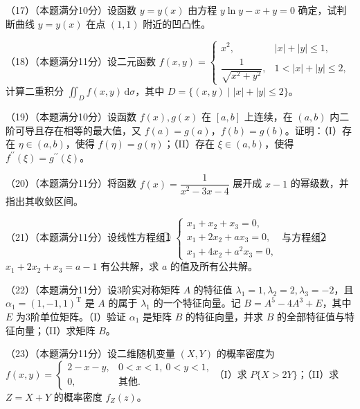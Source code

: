 \documentclass[UTF8,12pt]{ctexart}
\begin{document}
（17）（本题满分10分）设函数 \(\displaystyle y=y(x)\) 由方程 \(\displaystyle y\ln y-x+y=0\) 确定，试判断曲线 \(\displaystyle y=y(x)\) 在点 \(\displaystyle (1,\allowbreak 1)\) 附近的凹凸性。


（18）（本题满分11分）设二元函数 \(\displaystyle f(x,\allowbreak y)=\begin{cases}x^2,\allowbreak &|x|+|y|\le1,\allowbreak \\\dfrac{\displaystyle 1}{\displaystyle \sqrt{x^2+y^2}},\allowbreak &1<|x|+|y|\le2,\allowbreak \end{cases}\) 计算二重积分 \(\displaystyle \iint_Df(x,\allowbreak y)\,\mathrm d\sigma\)，其中 \(\displaystyle D=\{(x,\allowbreak y)\mid |x|+|y|\le2\}\)。


（19）（本题满分10分）设函数 \(\displaystyle f(x),\allowbreak g(x)\) 在 \(\displaystyle [a,\allowbreak b]\) 上连续，在 \(\displaystyle (a,\allowbreak b)\) 内二阶可导且存在相等的最大值，又 \(\displaystyle f(a)=g(a)\)，\(\displaystyle f(b)=g(b)\)。证明：（I）存在 \(\displaystyle \eta\in(a,\allowbreak b)\)，使得 \(\displaystyle f(\eta)=g(\eta)\)；（II）存在 \(\displaystyle \xi\in(a,\allowbreak b)\)，使得 \(\displaystyle f^{\prime\prime}(\xi)=g^{\prime\prime}(\xi)\)。


（20）（本题满分11分）将函数 \(\displaystyle f(x)=\dfrac{\displaystyle 1}{\displaystyle x^2-3x-4}\) 展开成 \(\displaystyle x-1\) 的幂级数，并指出其收敛区间。


（21）（本题满分11分）设线性方程组\textcircled{1} \(\displaystyle \begin{cases}x_1+x_2+x_3=0,\allowbreak \\x_1+2x_2+ax_3=0,\allowbreak \\x_1+4x_2+a^2x_3=0,\allowbreak \end{cases}\) 与方程组\textcircled{2} \(\displaystyle x_1+2x_2+x_3=a-1\) 有公共解，求 \(\displaystyle a\) 的值及所有公共解。


（22）（本题满分11分）设3阶实对称矩阵 \(\displaystyle A\) 的特征值 \(\displaystyle \lambda_1=1,\allowbreak \lambda_2=2,\allowbreak \lambda_3=-2\)，且 \(\displaystyle \alpha_1=(1,\allowbreak -1,\allowbreak 1)^{\mathrm T}\) 是 \(\displaystyle A\) 的属于 \(\displaystyle \lambda_1\) 的一个特征向量。记 \(\displaystyle B=A^5-4A^3+E\)，其中 \(\displaystyle E\) 为3阶单位矩阵。（I）验证 \(\displaystyle \alpha_1\) 是矩阵 \(\displaystyle B\) 的特征向量，并求 \(\displaystyle B\) 的全部特征值与特征向量；（II）求矩阵 \(\displaystyle B\)。


（23）（本题满分11分）设二维随机变量 \(\displaystyle (X,\allowbreak Y)\) 的概率密度为 \(\displaystyle f(x,\allowbreak y)=\begin{cases}2-x-y,\allowbreak &0<x<1,\allowbreak \ 0<y<1,\allowbreak \\0,\allowbreak &\text{其他}.\end{cases}\)（I）求 \(\displaystyle P\{X>2Y\}\)；（II）求 \(\displaystyle Z=X+Y\) 的概率密度 \(\displaystyle f_Z(z)\)。
\end{document}
